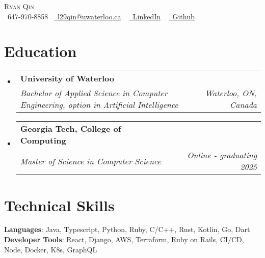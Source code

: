 \documentclass[letterpaper,11pt]{article}
\makeatletter
\newcommand{\resumeSubheading}[4]{
  \vspace{-2pt}\item
    \begin{tabular*}{1.0\textwidth}[t]{l@{\extracolsep{\fill}}r}
      \textbf{#1} & \textbf{\small #2} \\
      \textit{\small#3} & \textit{\small #4} \\
    \end{tabular*}\vspace{-7pt}
}
\newcommand{\resumeSubHeadingListStart}{\begin{itemize}[leftmargin=0.0in, label={}]}
\newcommand{\resumeSubHeadingListEnd}{\end{itemize}}
\makeatother
\begin{document}
\begin{center}
    {\Huge \scshape Ryan Qin} \\ \vspace{1pt}
    \small \raisebox{-0.1\height}\faPhone\ 647-970-8858~ \href{l29qin@uwaterloo.ca}{\raisebox{-0.2\height}\faEnvelope\  \underline{l29qin@uwaterloo.ca}} ~ 
    \href{https://www.linkedin.com/in/ryan-qin-4b8157130}{\raisebox{-0.2\height}\faLinkedin\ \underline{LinkedIn}}  ~
    \href{https://github.com/lang98}{\raisebox{-0.2\height}\faGithub\ \underline{Github}}
    \vspace{-8pt}
\end{center}


\section{Education}
  \resumeSubHeadingListStart
    \resumeSubheading
      {University of Waterloo}{}
      {Bachelor of Applied Science in Computer Engineering, option in Artificial Intelligence}{Waterloo, ON, Canada}
    \resumeSubheading
      {Georgia Tech, College of Computing}{}
      {Master of Science in Computer Science}{Online - graduating 2025}
  \resumeSubHeadingListEnd

%
\section{Technical Skills}
  \begin{itemize}[leftmargin=0.15in, label={}]
    \small{\item{
      \textbf{Languages}{: Java, Typescript, Python, Ruby, C/C++, Rust, Kotlin, Go, Dart} \\
      \textbf{Developer Tools}{: React, Django, AWS, Terraform, Ruby on Rails, CI/CD, Node, Docker, K8s, GraphQL} \\
    }}
  \end{itemize}
\vspace{-16pt}
\end{document}

